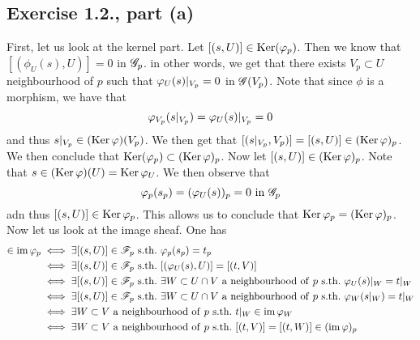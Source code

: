 \documentclass[11pt, a4paper, twoside]{article}
\begin{document}
\subsection{Exercise 1.2., part (a)}
	First, let us look at the kernel part. Let $[(s,U)]\in\operatorname{Ker}(\varphi_p)$. Then we know that $[(\phi_U(s),U)]=0$ in $\mathscr G_p$. in other words, we get that there exists $V_p\subset U$ neighbourhood of $p$ such that $\varphi_U(s)|_{V_p}=0$ in $\mathscr G(V_p)$. Note that since $\phi$ is a morphism, we have that 
	\begin{displaymath}
		\varphi_{V_p}(s|_{V_p})=\varphi_U(s)|_{V_p}=0
	\end{displaymath}
	and thus $s|_{V_p}\in(\operatorname{Ker}\varphi)(V_p)$. We then get that $[(s|_{V_p},V_p)]=[(s,U)]\in(\operatorname{Ker}\varphi)_p$. We then 		conclude that $\operatorname{Ker}(\varphi_p)\subset(\operatorname{Ker}\varphi)_p$. Now let $[(s,U)]\in(\operatorname{Ker}\varphi)_p$. Note that $s\in(\operatorname{Ker}\varphi)(U)=\operatorname{Ker}\varphi_U$. We then observe that 
	\begin{displaymath}
		\phi_p(s_p)=(\phi_U(s))_p=0\ \mathrm{in}\ \cG_p
	\end{displaymath}
	adn thus $[(s,U)]\in\operatorname{Ker}\varphi_p$. This allows us to conclude that $\operatorname{Ker}\varphi_p=(\operatorname{Ker}\varphi)_p$.\\
	Now let us look at the image sheaf. One has 
	\begin{align*}
		[(t,V)]\in\im\phi_p &\iff \exists [(s,U)]\in\cF_p\ \mathrm{s.th.}\ \phi_p(s_p)=t_p\\
						  &\iff \exists [(s,U)]\in\cF_p\ \mathrm{s.th.}\ [(\phi_U(s),U)]=[(t,V)]\\
						  &\iff \exists [(s,U)]\in\cF_p\ \mathrm{s.th.}\ \exists W\subset U\cap V\ \mathrm{a\ neighbourhood\ of}\ p\ \mathrm{s.th.}\ \phi_U(s)\restr{W}=t\restr{W}\\
						  &\iff \exists [(s,U)]\in\cF_p\ \mathrm{s.th.}\ \exists W\subset U\cap V\ \mathrm{a\ neighbourhood\ of}\ p\ \mathrm{s.th.}\ \phi_W(s\restr{W})=t\restr{W}\\
						  &\iff \exists W\subset V\ \mathrm{a\ neighbourhood\ of}\ p\ \mathrm{s.th.}\ t\restr{W}\in\im\phi_W\\
						  &\iff \exists W\subset V\ \mathrm{a\ neighbourhood\ of}\ p\ \mathrm{s.th.}\ [(t,V)]=[(t,W)]\in(\im\phi)_p\\
	\end{align*}
\end{document}
